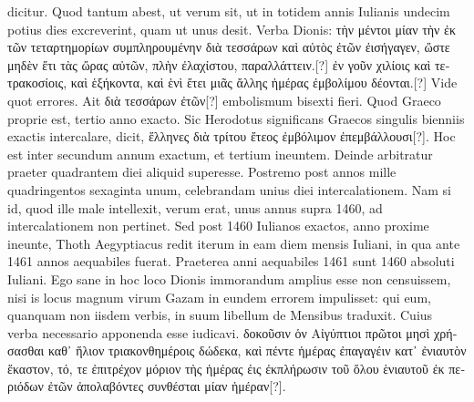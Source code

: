 dicitur.
Quod tantum abest, ut verum sit, ut in totidem
annis Iulianis undecim potius dies excreverint, quam ut unus desit.
Verba Dionis:
 \textgreek{τὴν μέντοι μίαν τὴν ἐκ τῶν τεταρτημορίων συμπληρουμένην
διὰ τεσσάρων καὶ αὐτὸς ἐτῶν ἐισήγαγεν, ὤστε μηδὲν ἔτι τὰς ὤρας αὐτῶν,
πλὴν ἐλαχίστου, παραλλάττειν.}[?]
\textgreek{ἐν γοῦν χιλίοις καὶ τετρακοσίοις, καὶ ἑξήκοντα,
καὶ ἑνὶ ἔτει μιᾶς ἄλλης ἡμέρας ἐμβολίμου δέονται.}[?]
Vide quot
errores.
Ait \textgreek{διὰ τεσσάρων ἐτῶν}[?] embolismum bisexti fieri.
Quod Graeco
proprie est, tertio anno exacto.
%
Sic Herodotus significans Graecos singulis
bienniis exactis intercalare, dicit, \textgreek{ἕλληνες διὰ τρίτου ἔτεος ἐμβόλιμον
ἐπεμβάλλουσι}[?].
Hoc est inter secundum annum exactum, et tertium
ineuntem.
Deinde arbitratur praeter quadrantem diei aliquid
superesse.
Postremo post annos mille quadringentos sexaginta unum,
celebrandam unius diei intercalationem.
Nam si id, quod ille male
intellexit, verum erat, unus annus supra 1460, ad intercalationem
non pertinet.
Sed post 1460 Iulianos exactos, anno proxime
ineunte, Thoth Aegyptiacus redit iterum in eam diem mensis Iuliani,
in qua ante 1461 annos aequabiles fuerat.
Praeterea anni aequabiles
1461 sunt 1460 absoluti Iuliani.
Ego sane in hoc loco Dionis
immorandum amplius esse non censuissem, nisi is locus magnum
virum Gazam in eundem errorem impulisset: qui eum, quanquam
non iisdem verbis, in suum libellum de Mensibus traduxit.
Cuius
verba necessario apponenda esse iudicavi.
\textgreek{δοκοῦσιν ὁν Αἰγύπτιοι πρῶτοι
μησὶ χρήσασθαι καθ᾽ ἥλιον τριακονθημέροις δώδεκα, καὶ πέντε ἡμέρας ἐπαγαγέιν
κατ᾽ ἐνιαυτὸν ἕκαστον, τό, τε ἐπιτρέχον μόριον τὴς ἡμέρας ἐις ἐκπλήρωσιν
τοῦ ὅλου ὲνιαυτοῦ ἐκ περιόδων ἐτῶν ἀπολαβόντες συνθέσται μίαν ἡμέραν}[?].
